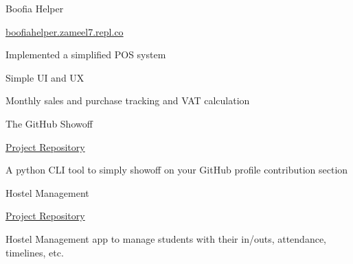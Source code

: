 \begin{cventries}
    \cventry
    {} %
    {Boofia Helper} %
    {} %
    {} %
    {
      \begin{cvitems} %
        \item {\hyperlink{boofiahelper.zameel7.repl.co}{boofiahelper.zameel7.repl.co}}
      	\item {Implemented a simplified POS system}
       \item {Simple UI and UX}
       \item {Monthly sales and purchase tracking and VAT calculation}
      \end{cvitems}
    }

    \cventry
    {} %
    {The GitHub Showoff} %
    {} %
    {} %
    {
      \begin{cvitems} %
        \item {\hyperlink{https://github.com/rabeeh-ta/the-github-showoff.git}{Project Repository}}
      	\item {A python CLI tool to simply showoff on your GitHub profile contribution section}
      \end{cvitems}
    }

    \cventry
    {} %
    {Hostel Management} %
    {} %
    {} %
    {
      \begin{cvitems} %
        \item {\hyperlink{https://hostel-app-frontend.vercel.app/authentication/sign-in}{Project Repository}}
      	\item {Hostel Management app to manage students with their in/outs, attendance, timelines, etc.}
      \end{cvitems}
    }
\end{cventries}